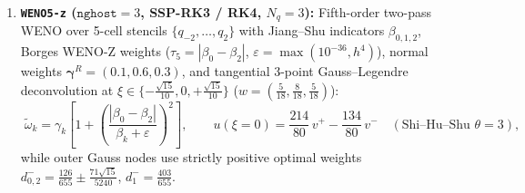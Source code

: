 \documentclass[11pt,a4paper]{article}
\newcommand{\code}[1]{\texttt{#1}}
\theoremstyle{definition}
\begin{document}
\begin{enumerate}
\item \textbf{\code{WENO5-z} ($\code{nghost}=3$, SSP-RK3 / RK4, $N_q=3$):} Fifth-order two-pass WENO over 5-cell stencils $\{q_{-2},\dots,q_2\}$ with Jiang--Shu indicators $\beta_{0,1,2}$, Borges WENO-Z weights ($\tau_5 = |\beta_0-\beta_2|$, $\varepsilon=\max(10^{-36}, h^4)$), normal weights $\boldsymbol{\gamma}^R=(0.1, 0.6, 0.3)$, and tangential 3-point Gauss--Legendre deconvolution at $\xi\in\{-\frac{\sqrt{15}}{10},0,+\frac{\sqrt{15}}{10}\}$ ($w=(\frac{5}{18},\frac{8}{18},\frac{5}{18})$):
\begin{equation}
\label{eq:weno5z}
\boxed{\;
\tilde{\omega}_k = \gamma_k\left[1 + \left(\frac{|\beta_0-\beta_2|}{\beta_k+\varepsilon}\right)^2\right],\qquad
u(\xi=0) = \frac{214}{80}\,v^+ - \frac{134}{80}\,v^- \quad (\text{Shi--Hu--Shu }\theta=3),
\;}
\end{equation}
while outer Gauss nodes use strictly positive optimal weights $d_{0,2}^- = \frac{126}{655} \pm \frac{71\sqrt{15}}{5240}$, $d_1^- = \frac{403}{655}$.
\end{enumerate}
\end{document}

